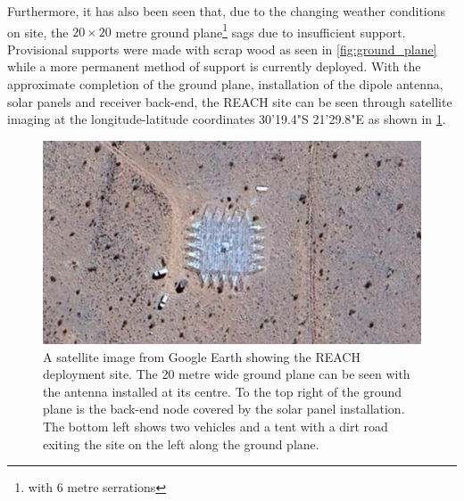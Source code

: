 Furthermore, it has also been seen that, due to the changing weather conditions on site, the $20 \times 20$ metre ground plane\footnote{with 6 metre serrations} sags due to insufficient support. Provisional supports were made with scrap wood as seen in \cref{fig:ground_plane} while a more permanent method of support is currently deployed. With the approximate completion of the ground plane, installation of the dipole antenna, solar panels and receiver back-end, the REACH site can be seen through satellite imaging at the longitude-latitude coordinates 30'19.4"S 21'29.8"E as shown in \cref{fig:sat_image}.
\begin{figure}
    \centering
    \includegraphics[width=\textwidth]{sat_image}
    \caption{A satellite image from Google Earth showing the REACH deployment site. The 20 metre wide ground plane can be seen with the antenna installed at its centre. To the top right of the ground plane is the back-end node covered by the solar panel installation. The bottom left shows two vehicles and a tent with a dirt road exiting the site on the left along the ground plane.}
    \label{fig:sat_image}
\end{figure}
